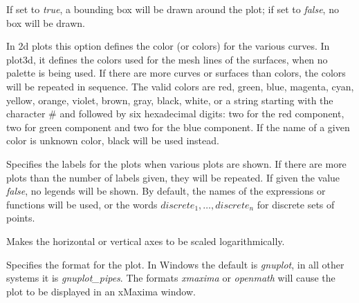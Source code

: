 \documentclass[../Maxima_Workbook.tex]{subfiles}
\begin{document}
\lzz {} \qquad {} \hfill {}

\lz If set to \emph{true}, a bounding box will be drawn around the plot; if set to \emph{false}, no box will be drawn.

\lzz {} \hfill {}

\lz In 2d plots this option defines the color (or colors) for the various curves. In plot3d, it defines the colors used for the mesh lines of the surfaces, when no palette is being used. If there are more curves or surfaces than colors, the colors will be repeated in sequence. The valid colors are red, green, blue, magenta, cyan, yellow, orange, violet, brown, gray, black, white, or a string starting with the character \# and followed by six hexadecimal digits: two for the red component, two for green component and two for the blue component. If the name of a given color is unknown color, black will be used instead.

\lzz {} \hfill {}

\lz Specifies the labels for the plots when various plots are shown. If there are more
plots than the number of labels given, they will be repeated. If given the value \emph{false}, no legends will be shown. By default, the names of the expressions or functions will be used, or the words $ discrete_1,\dots,discrete_n $ for discrete sets of points.

\lzz {} \qquad {} \hfill {}

 \qquad {} \hfill {}

\lz Makes the horizontal or vertical axes to be scaled logarithmically.

\lzz {} \qquad {} \hfill {}

\lz Specifies the format for the plot. In Windows the default is \emph{gnuplot}, in all other systems it is \emph{gnuplot\_pipes}. The formats \emph{xmaxima} or \emph{openmath} will cause the plot to be displayed in an xMaxima window.
\end{document}
